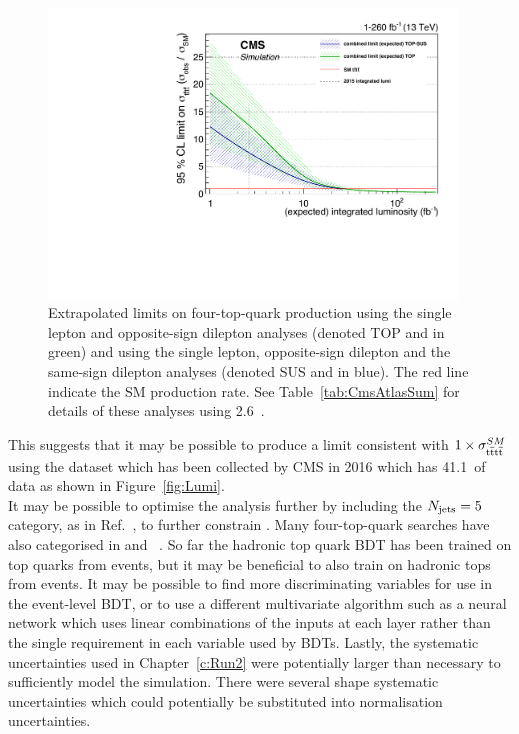 \begin{figure}[ht!]
\begin{center}
    \includegraphics[width=0.97\textwidth]{images/Conclusion/combined_limitvslumi.pdf}
    \caption{Extrapolated limits on four-top-quark production using the single lepton and opposite-sign dilepton analyses (denoted TOP and in green) and using the single lepton, opposite-sign dilepton and the same-sign dilepton analyses (denoted SUS and in blue). The red line indicate the SM production rate. See Table~\ref{tab:CmsAtlasSum} for details of these analyses using 2.6~\fbinv.}
    \label{fig:ttbarXstairway}
\end{center}
\end{figure}

This suggests that it may be possible to produce a limit consistent with $1 \times \sigma_{{\mathrm{t}\overline{\mathrm{t}}\mathrm{t}\overline{\mathrm{t}}}}^{SM} $ using the dataset which has been collected by CMS in 2016 which has 41.1~\fbinv of data as shown in Figure~\ref{fig:Lumi}.\\

It may be possible to optimise the analysis further by including the $N_{\textrm{jets}}=5$ category, as in Ref.~\cite{ATLAS-CONF-2016-020}, to further constrain \ttbar. Many four-top-quark searches have also categorised in \HT and \MET~\cite{ATLAS-CONF-2016-020,Chatrchyan:2013fea}. So far the hadronic top quark BDT has been trained on top quarks from \ttbar events, but it may be beneficial to also train on hadronic tops from \tttt events. It may be possible to find more discriminating variables for use in the event-level BDT, or to use a different multivariate algorithm such as a neural network which uses linear combinations of the inputs at each layer rather than the single requirement in each variable used by BDTs. Lastly, the systematic uncertainties used in Chapter~\ref{c:Run2} were potentially larger than necessary to sufficiently model the simulation. There were several shape systematic uncertainties which could potentially be substituted into normalisation uncertainties.\\

